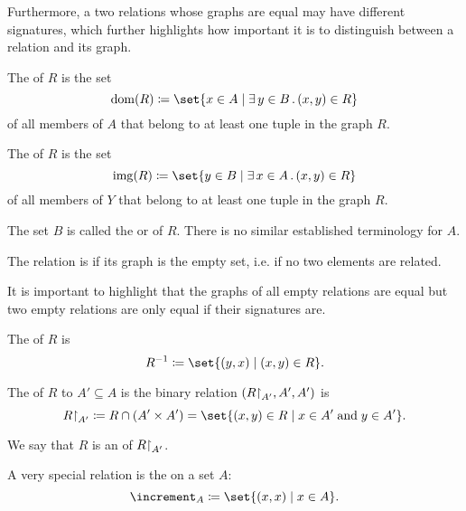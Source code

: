 \begin{definition}
\begin{thmenum}[series=def:binary_relation]
    Furthermore, a two relations whose graphs are equal may have different signatures, which further highlights how important it is to distinguish between a relation and its graph.

     The  of \( R \) is the set
    \begin{equation*}
      \dom(R) \coloneqq \set{ x \in A \given \qexists {y \in B} (x, y) \in R }
    \end{equation*}
    of all members of \( A \) that belong to at least one tuple in the graph \( R \).

     The  of \( R \) is the set
    \begin{equation*}
      \img(R) \coloneqq \set{ y \in B \given \qexists {x \in A} (x, y) \in R }
    \end{equation*}
    of all members of \( Y \) that belong to at least one tuple in the graph \( R \).

     The set \( B \) is called the  or  of \( R \). There is no similar established terminology for \( A \).

     The relation is  if its graph is the empty set, i.e. if no two elements are related.

    It is important to highlight that the graphs of all empty relations are equal but two empty relations are only equal if their signatures are.

     The  of \( R \) is
    \begin{equation*}
      R^{-1} \coloneqq \set{ (y, x) \given (x, y) \in R }.
    \end{equation*}

     The  of \( R \) to \( A' \subseteq A \) is the binary relation \( (R{\upharpoonright}_{A'}, A', A') \) is
    \begin{equation*}
      R\restr_{A'} \coloneqq R \cap (A' \times A') = \set{ (x, y) \in R \given x \in A' \T{and} y \in A' }.
    \end{equation*}

    We say that \( R \) is an  of \( R{\upharpoonright}_{A'} \).

     A very special relation is the  on a set \( A \):
    \begin{equation*}
      \increment_A \coloneqq \set{ (x, x) \given x \in A }.
    \end{equation*}


\end{thmenum}
\end{definition}
